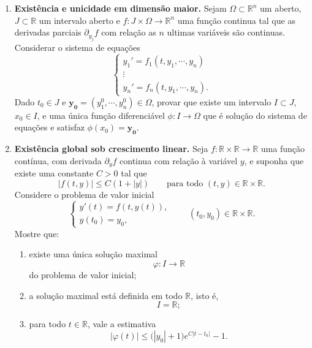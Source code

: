 \documentclass[a4paper,
11pt,  reqno]{amsart}
\begin{document}
\begin{enumerate}
    
\item \textbf{Existência e unicidade em dimensão maior.} Sejam $\Omega\subset\mathbb{R}^n$ um aberto, $J\subset \mathbb{R}$ um intervalo aberto e $f:J\times\Omega\to\mathbb{R}^n$ uma função continua tal que as derivadas parciais $\partial_{y_j}f$ com relação as $n$ ultimas variáveis são continuas. Considerar o sistema de equações
\begin{equation*}
    \left\{\begin{array}{c}
        y_1' = f_1(t,y_1,\cdots,y_n)  \\
        \vdots \\
        y_n' = f_n(t,y_1,\cdots,y_n) .
    \end{array}\right.
\end{equation*}
Dado $t_0\in J$ e $\mathbf{y_0}=(y_1^0,\cdots,y_n^0)\in\Omega$, provar que existe um intervalo $I\subset J$, $x_0\in I$, e uma única função diferenciável $\phi:I\to\Omega$ que é solução do sistema de equações e satisfaz $\phi(x_0)=\mathbf{y_0}$. 



\medskip

\item {\bf Exist\^encia global sob crescimento linear.} Seja $f:\mathbb{R}\times\mathbb{R} \to\mathbb{R}$ uma fun\c{c}\~ao cont\'inua, com derivada $\partial_y f$ continua com relação \`a vari\'avel $y$, e suponha que existe uma constante $C>0$ tal que
\[
|f(t,y)|\le C(1+|y|)
\qquad \text{para todo } (t,y)\in \mathbb{R}\times\mathbb{R}.
\]
Considere o problema de valor inicial
\[
\begin{cases}
y'(t)=f(t,y(t)),\\
y(t_0)=y_0,
\end{cases}
\qquad (t_0,y_0)\in \mathbb{R}\times\mathbb{R}.
\]
Mostre que:

\begin{enumerate}
    \item existe uma \'unica solu\c{c}\~ao maximal
    \[
    \varphi:I\to\mathbb{R}
    \]
    do problema de valor inicial;

    \item a solu\c{c}\~ao maximal est\'a definida em todo $\mathbb{R}$, isto \'e,
    \[
    I=\mathbb{R};
    \]

    \item para todo $t\in\mathbb{R}$, vale a estimativa
    \[
    |\varphi(t)|
    \le
    \bigl(|y_0|+1\bigr)e^{C|t-t_0|}-1.
    \]
\end{enumerate}


\end{enumerate}
\end{document}
